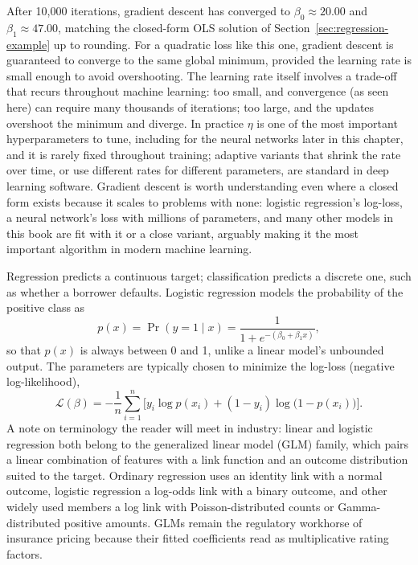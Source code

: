 \documentclass[../ai_in_finance]{subfiles}
\begin{document}
After 10,000 iterations, gradient descent has converged to $\beta_0 \approx 20.00$ and $\beta_1 \approx 47.00$, matching the closed-form OLS solution of Section~\ref{sec:regression-example} up to rounding. For a quadratic loss like this one, gradient descent is guaranteed to converge to the same global minimum, provided the learning rate is small enough to avoid overshooting.
The learning rate itself involves a trade-off that recurs throughout machine learning: too small, and convergence (as seen here) can require many thousands of iterations; too large, and the updates overshoot the minimum and diverge.
In practice $\eta$ is one of the most important hyperparameters to tune, including for the neural networks later in this chapter, and it is rarely fixed throughout training; adaptive variants that shrink the rate over time, or use different rates for different parameters, are standard in deep learning software.
Gradient descent is worth understanding even where a closed form exists because it scales to problems with none: logistic regression's log-loss, a neural network's loss with millions of parameters, and many other models in this book are fit with it or a close variant, arguably making it the most important algorithm in modern machine learning.

\label{sec:classification-example}

Regression predicts a continuous target; classification predicts a discrete one, such as whether a borrower defaults. Logistic regression models the probability of the positive class as
\begin{equation}
\label{eq:ml-logistic}
p(x) = \Pr(y=1 \mid x) = \frac{1}{1 + e^{-(\beta_0 + \beta_1 x)}},
\end{equation}
so that $p(x)$ is always between 0 and 1, unlike a linear model's unbounded output. The parameters are typically chosen to minimize the log-loss (negative log-likelihood),
\begin{equation}
\label{eq:ml-logloss}
\mathcal{L}(\beta) = -\frac{1}{n}\sum_{i=1}^n \Big[y_i \log p(x_i) + (1-y_i)\log\big(1-p(x_i)\big)\Big].
\end{equation}
A note on terminology the reader will meet in industry: linear and logistic regression both belong to the generalized linear model (GLM) family, which pairs a linear combination of features with a link function and an outcome distribution suited to the target. Ordinary regression uses an identity link with a normal outcome, logistic regression a log-odds link with a binary outcome, and other widely used members a log link with Poisson-distributed counts or Gamma-distributed positive amounts. GLMs remain the regulatory workhorse of insurance pricing because their fitted coefficients read as multiplicative rating factors.
\end{document}
